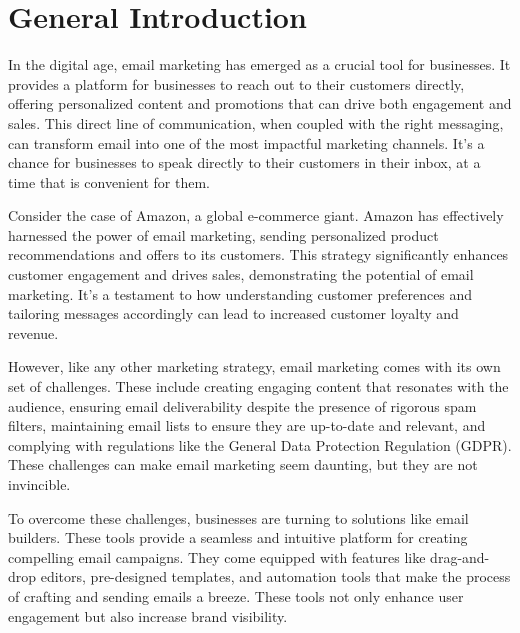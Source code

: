 \chapter*{General Introduction}


In the digital age, email marketing has emerged as a crucial tool for businesses. It provides a platform for businesses to reach out to their customers directly, offering personalized content and promotions that can drive both engagement and sales. This direct line of communication, when coupled with the right messaging, can transform email into one of the most impactful marketing channels. It’s a chance for businesses to speak directly to their customers in their inbox, at a time that is convenient for them.

\vspace{10pt}

Consider the case of Amazon, a global e-commerce giant. Amazon has effectively harnessed the power of email marketing, sending personalized product recommendations and offers to its customers. This strategy significantly enhances customer engagement and drives sales, demonstrating the potential of email marketing. It’s a testament to how understanding customer preferences and tailoring messages accordingly can lead to increased customer loyalty and revenue.

\vspace{10pt}

However, like any other marketing strategy, email marketing comes with its own set of challenges. These include creating engaging content that resonates with the audience, ensuring email deliverability despite the presence of rigorous spam filters, maintaining email lists to ensure they are up-to-date and relevant, and complying with regulations like the General Data Protection Regulation (GDPR). These challenges can make email marketing seem daunting, but they are not invincible.

\vspace{10pt}

To overcome these challenges, businesses are turning to solutions like email builders. These tools provide a seamless and intuitive platform for creating compelling email campaigns. They come equipped with features like drag-and-drop editors, pre-designed templates, and automation tools that make the process of crafting and sending emails a breeze. These tools not only enhance user engagement but also increase brand visibility.

